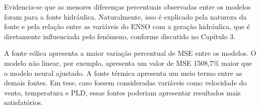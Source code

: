 \begin{table}[htb]
  \centering
\end{table}

Evidencia-se que as menores diferenças percentuais observadas entre os modelos foram para a fonte hidráulica. Naturalmente,
isso é explicado pela natureza da fonte e pela relação entre as variáveis do ENSO com a geração hidráulica, que é diretamente
influenciada pelo fenômeno, conforme discutido no Capítulo 3.

\begin{table}[htb]
  \centering
\end{table}

A fonte eólica apresenta a maior variação percentual de MSE entre os modelos. O modelo não linear, por exemplo, apresenta
um valor de MSE 1508,7\% maior que o modelo neural ajustado. A fonte térmica apresenta um meio termo entre as demais fontes.
Em tese, caso fossem consideradas variáveis como velocidade do vento, temperatura e PLD, essas fontes poderiam apresentar resultados
mais satisfatórios. 

